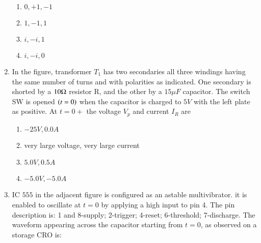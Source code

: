 \documentclass[journal,12pt,onecolumn]{IEEEtran}
\theoremstyle{remark}
\begin{document}
\begin{enumerate}
    \begin{enumerate}
        \item $0, +1, -1$
        \item $1, -1, 1$
        \item $i, -i, 1$
        \item $i, -i, 0$
    \end{enumerate}
\item In the figure, transformer $T_1$ has two secondaries all three windings having the same number of turns and with polarities as indicated. One secondary is shorted by a $10 \ohm$ resistor R, and the other by a $15 \mu F$ capacitor. The switch SW is opened $\left(t=0\right)$ when the capacitor is charged to $5V$ with the left plate as positive. At $t=0+$ the voltage $V_p$ and current $I_R$ are
\begin{figure}[!ht]
\centering
{}%

\label{fig:my_label}
\end{figure}
\begin{enumerate}
\item $-25 V, 0.0 A$
\item very large voltage, very large current
\item $5.0 V, 0.5 A$
\item $-5.0 V, -5.0 A$
\end{enumerate}

\item IC $555$ in the adjacent figure is configured as an astable
multivibrator. it is enabled to oscillate at $t=0$ by applying a high input to pin 4. The pin description is: 1 and 8-supply; 2-trigger; 4-reset; 6-threshold; 7-discharge. The waveform appearing across the capacitor starting from $t=0$, as observed on a storage CRO is:


\end{enumerate}
\end{document}
